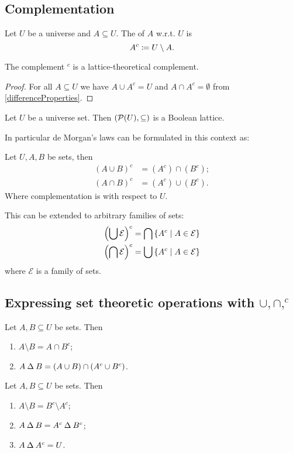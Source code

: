 \subsection{Complementation}
\begin{definition}
Let $U$ be a universe and $A\subseteq U$. The  of $A$ w.r.t. $U$ is
\[ A^c \coloneqq U\setminus A. \]
\end{definition}

\begin{lemma}
The complement $^c$ is a lattice-theoretical complement.
\end{lemma}
\begin{proof}
For all $A\subseteq U$ we have $A\cup A^c = U$ and $A\cap A^c = \emptyset$ from \ref{differenceProperties}.
\end{proof}
\begin{corollary}
Let $U$ be a universe set. Then $\sSet{\powerset(U), \subseteq}$ is a Boolean lattice.
\end{corollary}

In particular de Morgan's laws can be formulated in this context as:
\begin{proposition}
Let $U,A,B$ be sets, then
\begin{align*}
(A\cup B)^c &= (A^c)\cap (B^c); \\
(A\cap B)^c &= (A^c)\cup (B^c).
\end{align*}
Where complementation is with respect to $U$.

This can be extended to arbitrary families of sets:
\begin{align*}
\left(\bigcup \mathcal{E}\right)^c &= \bigcap\setbuilder{A^c}{A\in\mathcal{E}} \\
\left(\bigcap \mathcal{E}\right)^c &= \bigcup\setbuilder{A^c}{A\in\mathcal{E}}
\end{align*}
where $\mathcal{E}$ is a family of sets.
\end{proposition}

\subsection{Expressing set theoretic operations with $\cup,\cap, ^c$}
\begin{proposition}
Let $A,B\subseteq U$ be sets. Then
\begin{enumerate}
\item $A\setminus B = A \cap B^c$;
\item $A\mathbin{\Delta} B = (A\cup B)\cap (A^c\cup B^c)$.
\end{enumerate}
\end{proposition}
\begin{corollary}
Let $A,B \subseteq U$ be sets. Then
\begin{enumerate}
\item $A\setminus B = B^c\setminus A^c$;
\item $A \mathbin{\Delta} B = A^c \mathbin{\Delta} B^c$;
\item $A \mathbin{\Delta} A^c = U$.
\end{enumerate}
\end{corollary}

